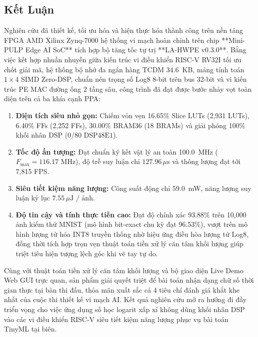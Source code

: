 \documentclass[conference]{IEEEtran}
\begin{document}
\subsection{Kết Luận}
\hspace*{1em} Nghiên cứu đã thiết kế, tối ưu hóa và hiện thực hóa thành công trên nền tảng FPGA AMD Xilinx Zynq-7000 hệ thống vi mạch hoàn chỉnh trên chip **Mini-PULP Edge AI SoC** tích hợp bộ tăng tốc tự trị **LA-HWPE v0.3.0**. Bằng việc kết hợp nhuần nhuyễn giữa kiến trúc vi điều khiển RISC-V RV32I tối ưu chốt giải mã, hệ thống bộ nhớ đa ngân hàng TCDM 34.6~KB, mảng tính toán $1\times 4$ SIMD Zero-DSP, chuẩn nén trọng số Log8 8-bit trên bus 32-bit và vi kiến trúc PE MAC đường ống 2 tầng sâu, công trình đã đạt được bước nhảy vọt toàn diện trên cả ba khía cạnh PPA:
\begin{enumerate}
    \item \textbf{Diện tích siêu nhỏ gọn:} Chiếm vỏn vẹn 16.65\% Slice LUTs (2,931 LUTs), 6.40\% FFs (2,252 FFs), 30.00\% BRAM36 (18 BRAMs) và giải phóng 100\% khối nhân DSP ($0/80\text{ DSP48E1}$).
    \item \textbf{Tốc độ ấn tượng:} Đạt chuẩn ký kết vật lý an toàn 100.0~MHz ($F_{\max} = 116.17\text{ MHz}$), độ trễ suy luận chỉ $127.96\,\mu\text{s}$ và thông lượng đạt tới 7,815 FPS.
    \item \textbf{Siêu tiết kiệm năng lượng:} Công suất động chỉ 59.0~mW, năng lượng suy luận kỷ lục $7.55\,\mu\text{J / ảnh}$.
    \item \textbf{Độ tin cậy và tính thực tiễn cao:} Đạt độ chính xác 93.88\% trên 10,000 ảnh kiểm thử MNIST (mô hình bit-exact chu kỳ đạt 96.53\%), vượt trên mô hình lượng tử hóa INT8 truyền thống nhờ hiệu ứng điều hòa lượng tử Log8, đồng thời tích hợp trọn vẹn thuật toán tiền xử lý căn tâm khối lượng giúp triệt tiêu hiện tượng lệch góc khi vẽ tay tự do.
\end{enumerate}

Cùng với thuật toán tiền xử lý căn tâm khối lượng và bộ giao diện Live Demo Web GUI trực quan, sản phẩm giải quyết triệt để bài toán nhận dạng chữ số thời gian thực tại bàn thi đấu, thỏa mãn xuất sắc cả 4 tiêu chí đánh giá khắt khe nhất của cuộc thi thiết kế vi mạch AI. Kết quả nghiên cứu mở ra hướng đi đầy triển vọng cho việc ứng dụng số học logarit xấp xỉ không dùng khối nhân DSP vào các vi điều khiển RISC-V siêu tiết kiệm năng lượng phục vụ bài toán TinyML tại biên.

\newpage
\end{document}
